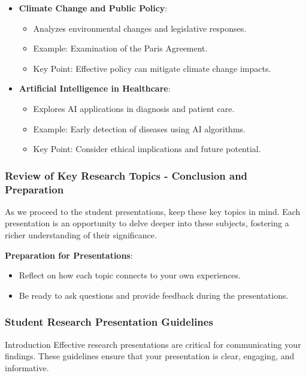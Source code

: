 \documentclass[aspectratio=169]{beamer}
\begin{document}
\begin{frame}[fragile]
\begin{itemize}
        \item \textbf{Climate Change and Public Policy}:
            \begin{itemize}
                \item Analyzes environmental changes and legislative responses.
                \item Example: Examination of the Paris Agreement.
                \item Key Point: Effective policy can mitigate climate change impacts.
            \end{itemize}
        
        \item \textbf{Artificial Intelligence in Healthcare}:
            \begin{itemize}
                \item Explores AI applications in diagnosis and patient care.
                \item Example: Early detection of diseases using AI algorithms.
                \item Key Point: Consider ethical implications and future potential.
            \end{itemize}
    \end{itemize}
\end{frame}

\begin{frame}[fragile]
    \frametitle{Review of Key Research Topics - Conclusion and Preparation}
    As we proceed to the student presentations, keep these key topics in mind. Each presentation is an opportunity to delve deeper into these subjects, fostering a richer understanding of their significance.

    \textbf{Preparation for Presentations}:
    \begin{itemize}
        \item Reflect on how each topic connects to your own experiences.
        \item Be ready to ask questions and provide feedback during the presentations.
    \end{itemize}
\end{frame}

\begin{frame}[fragile]
    \frametitle{Student Research Presentation Guidelines}
    \begin{block}{Introduction}
        Effective research presentations are critical for communicating your findings. These guidelines ensure that your presentation is clear, engaging, and informative.
    \end{block}
\end{frame}
\end{document}
